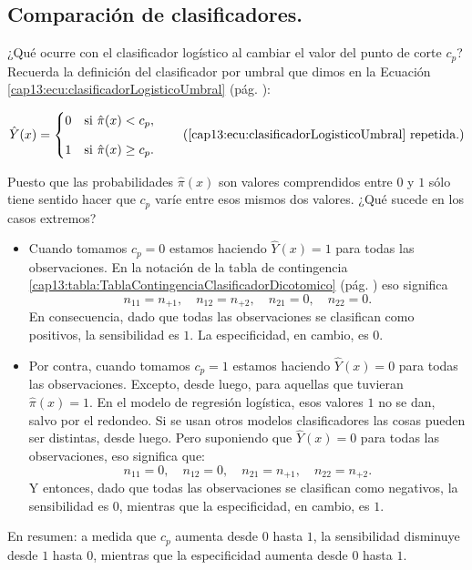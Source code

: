 \subsection{Comparación de clasificadores. }
\label{cap13:subsection:seleccionPuntoCorte}

¿Qué ocurre con el clasificador logístico al cambiar el valor del punto de corte $c_p$? Recuerda la definición del clasificador por umbral que dimos en la Ecuación \ref{cap13:ecu:clasificadorLogisticoUmbral} (pág. \pageref{cap13:ecu:clasificadorLogisticoUmbral}):

\begin{equation*}
\hat Y(x) =
\begin{cases}
	0 &\mbox{si } \hat{\pi}(x) < c_p,\\[3mm]
	1 &\mbox{si } \hat{\pi}(x) \geq c_p.
\end{cases}	
	\tag{\ref{cap13:ecu:clasificadorLogisticoUmbral} repetida.}
\end{equation*}

Puesto que las probabilidades $\hat{\pi}(x)$ son valores comprendidos entre $0$ y $1$ sólo tiene sentido hacer que $c_p$ varíe entre esos mismos dos valores. ¿Qué sucede en los casos extremos?

\begin{itemize}
	\item Cuando tomamos $c_p=0$ estamos haciendo $\hat Y(x) =1$ para todas las observaciones. En la notación de la tabla de contingencia \ref{cap13:tabla:TablaContingenciaClasificadorDicotomico} (pág. \pageref{cap13:tabla:TablaContingenciaClasificadorDicotomico}) eso significa
	\[n_{11}= n_{+1},\quad n_{12}= n_{+2},\quad n_{21}= 0,\quad n_{22}= 0.\]
	En consecuencia, dado que  todas las observaciones se clasifican como positivos,  la sensibilidad es $1$.  La especificidad, en cambio, es $0$.
	
	\item Por contra, cuando tomamos $c_p=1$ estamos haciendo $\hat Y(x) =0$ para todas las observaciones.  Excepto, desde luego, para aquellas que tuvieran $\hat\pi(x)=1 $. En el modelo de regresión logística, esos valores $1$ no se dan, salvo por el redondeo.  Si se usan otros modelos clasificadores las cosas pueden ser distintas, desde luego. Pero suponiendo que $\hat Y(x) =0$ para todas las observaciones, eso significa que:
	\[n_{11}= 0,\quad n_{12}= 0,\quad n_{21}= n_{+1},\quad n_{22}= n_{+2}.\]
	Y entonces, dado que  todas las observaciones se clasifican como negativos,  la sensibilidad es $0$, mientras que la especificidad, en cambio, es $1$.
	
\end{itemize}
En resumen: a medida que $c_p$ aumenta desde $0$ hasta $1$, la sensibilidad disminuye desde $1$ hasta $0$, mientras que la especificidad aumenta desde $0$ hasta $1$.

